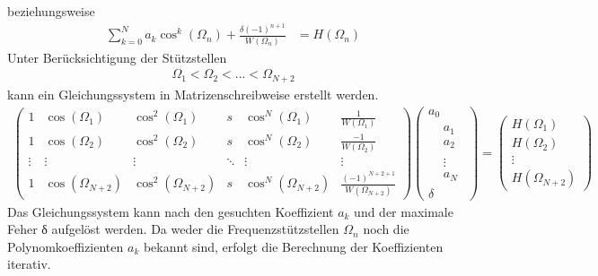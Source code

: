 beziehungsweise
\begin{align}
\sum\limits_{k = 0}^{N}{a_{k}  \cos^{k}\left( \Omega_{n} \right)} + \frac{\delta  ( - 1)^{n + 1}}{W\left( \Omega_{n} \right)} &= H\left( \Omega_{n} \right) \label{eq:9.146}
\end{align}
Unter Berücksichtigung der Stützstellen
\begin{align}
\Omega_{1} < \Omega_{2} < ... < \Omega_{N + 2} \label{eq:9.147}
\end{align}
kann ein Gleichungssystem in Matrizenschreibweise erstellt werden.
\begin{align}
\begin{pmatrix}
1 & \cos\left( \Omega_{1} \right) & \cos^{2}\left( \Omega_{1} \right) & s & \cos^{N}\left( \Omega_{1} \right) & \frac{1}{W\left( \Omega_{1} \right)} \\
1 & \cos\left( \Omega_{2} \right) & \cos^{2}\left( \Omega_{2} \right) & s & \cos^{N}\left( \Omega_{2} \right) & \frac{- 1}{W\left( \Omega_{2} \right)} \\
 \vdots & \vdots & \vdots & \ddots & \vdots & \vdots \\
1 & \cos\left( \Omega_{N + 2} \right) & \cos^{2}\left( \Omega_{N + 2} \right) & s & \cos^{N}\left( \Omega_{N + 2} \right) & \frac{( - 1)^{N + 2 + 1}}{W\left( \Omega_{N + 2} \right)}
\end{pmatrix}  \begin{pmatrix}
a_{0} \\
\begin{aligned}
 & a_{1} \\
 & a_{2}
\end{aligned} \\
\begin{aligned}
 & \vdots \\
 & a_{N}
\end{aligned} \\
\delta
\end{pmatrix} = \begin{pmatrix}
H\left( \Omega_{1} \right) \\
H\left( \Omega_{2} \right) \\
 \vdots \\
H\left( \Omega_{N + 2} \right)
\end{pmatrix} \label{eq:9.148}
\end{align}
Das Gleichungssystem kann nach den gesuchten Koeffizient \(a_{k}\) und der maximale Feher δ aufgelöst werden. Da weder die Frequenzstützstellen \(Ω_{n}\) noch die Polynomkoeffizienten \(a_{k}\) bekannt sind, erfolgt die Berechnung der Koeffizienten iterativ.

